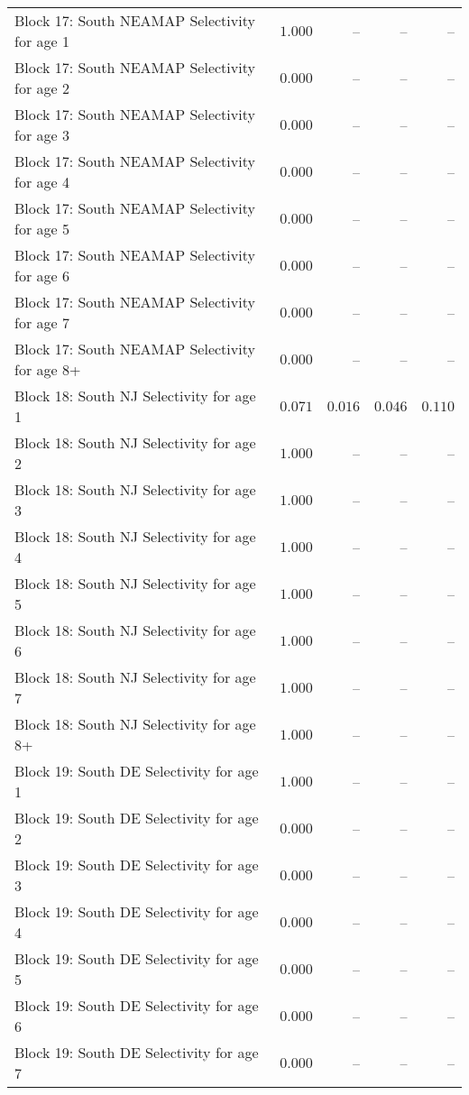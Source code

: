 \documentclass[
]{article}
\begin{document}
\begin{landscape}
\begin{longtable}[t]{lrrrr}
\addlinespace
Block 17: South NEAMAP Selectivity for age 1 & $1.000$ & -- & -- & --\\
Block 17: South NEAMAP Selectivity for age 2 & $0.000$ & -- & -- & --\\
Block 17: South NEAMAP Selectivity for age 3 & $0.000$ & -- & -- & --\\
Block 17: South NEAMAP Selectivity for age 4 & $0.000$ & -- & -- & --\\
Block 17: South NEAMAP Selectivity for age 5 & $0.000$ & -- & -- & --\\
\addlinespace
Block 17: South NEAMAP Selectivity for age 6 & $0.000$ & -- & -- & --\\
Block 17: South NEAMAP Selectivity for age 7 & $0.000$ & -- & -- & --\\
Block 17: South NEAMAP Selectivity for age 8+ & $0.000$ & -- & -- & --\\
Block 18: South NJ Selectivity for age 1 & $0.071$ & $0.016$ & $0.046$ & $0.110$\\
Block 18: South NJ Selectivity for age 2 & $1.000$ & -- & -- & --\\
\addlinespace
Block 18: South NJ Selectivity for age 3 & $1.000$ & -- & -- & --\\
Block 18: South NJ Selectivity for age 4 & $1.000$ & -- & -- & --\\
Block 18: South NJ Selectivity for age 5 & $1.000$ & -- & -- & --\\
Block 18: South NJ Selectivity for age 6 & $1.000$ & -- & -- & --\\
Block 18: South NJ Selectivity for age 7 & $1.000$ & -- & -- & --\\
\addlinespace
Block 18: South NJ Selectivity for age 8+ & $1.000$ & -- & -- & --\\
Block 19: South DE Selectivity for age 1 & $1.000$ & -- & -- & --\\
Block 19: South DE Selectivity for age 2 & $0.000$ & -- & -- & --\\
Block 19: South DE Selectivity for age 3 & $0.000$ & -- & -- & --\\
Block 19: South DE Selectivity for age 4 & $0.000$ & -- & -- & --\\
\addlinespace
Block 19: South DE Selectivity for age 5 & $0.000$ & -- & -- & --\\
Block 19: South DE Selectivity for age 6 & $0.000$ & -- & -- & --\\
Block 19: South DE Selectivity for age 7 & $0.000$ & -- & -- & --\\

\end{longtable}
\end{landscape}
\end{document}
